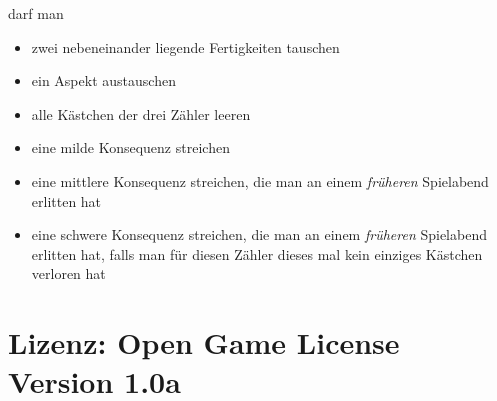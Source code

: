 \documentclass{tufte-handout}
\begin{document}
 darf man

\begin{itemize}
\item zwei nebeneinander liegende Fertigkeiten tauschen
\item ein Aspekt austauschen
\item alle Kästchen der drei Zähler leeren
\item eine milde Konsequenz streichen
\item eine mittlere Konsequenz streichen, die man an einem \textit{früheren}
  Spielabend erlitten hat
\item eine schwere Konsequenz streichen, die man an einem
  \textit{früheren} Spielabend erlitten hat, falls man für diesen
  Zähler dieses mal kein einziges Kästchen verloren hat
\end{itemize}

\clearpage


\section{Lizenz: Open Game License Version 1.0a}

\fontsize{7.5pt}{8pt}\selectfont
\end{document}
